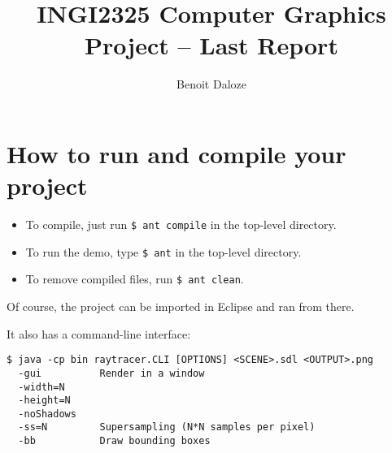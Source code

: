 \documentclass[a4paper,11pt]{article}
\title{INGI2325 Computer Graphics \\
  Project -- Last Report}
\author{Benoit Daloze}
\begin{document}
\maketitle

\section{How to run and compile your project}

\begin{itemize}
  \item To compile, just run \texttt{\$ ant compile} in the top-level directory.
  \item To run the demo, type \texttt{\$ ant} in the top-level directory.
  \item To remove compiled files, run \texttt{\$ ant clean}.
\end{itemize}

Of course, the project can be imported in Eclipse and ran from there.

It also has a command-line interface:
\begin{verbatim}
$ java -cp bin raytracer.CLI [OPTIONS] <SCENE>.sdl <OUTPUT>.png
  -gui          Render in a window
  -width=N
  -height=N
  -noShadows
  -ss=N         Supersampling (N*N samples per pixel)
  -bb           Draw bounding boxes
\end{verbatim}
\end{document}
